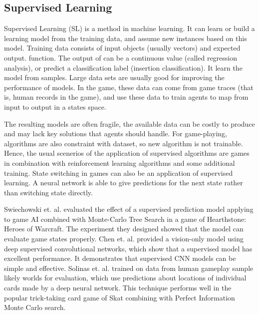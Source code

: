 \documentclass[11pt,en]{elegantpaper}
\begin{document}
\subsection{Supervised Learning}
Supervised Learning (SL) is a method in machine learning. It can learn or build a learning model from the training data, and assume new instances based on this model. Training data consists of input objects (usually vectors) and expected output. function. The output of can be a continuous value (called regression analysis), or predict a classification label (insertion classification). It learn the model from samples. Large data sets are usually good for improving the performance of models. In the game, these data can come from game traces (that is, human records in the game), and use these data to train agents to map from input to output in a states space.

The resulting models are often fragile, the available data can be costly to produce and may lack key solutions that agents should handle. For game-playing, algorithms are also constraint with dataset, so new algorithm is not trainable. Hence, the usual scenerios of the application of supervised algorithms are games in combination with reinforcement learning algorithms and some additional training. State switching in games can also be an application of supervised learning. A neural network is able to give predictions for the next state rather than switching state directly.

Swiechowski et. al. \cite{a1} evaluated the effect of a supervised prediction model applying to game AI combined with Monte-Carlo Tree Search in a game of Hearthstone: Heroes of Warcraft. The experiment they designed showed that the model can evaluate game states properly. Chen et. al. \cite{a2} provided a vision-only model using deep supervised convolutional networks, which show that a supervised model has excellent performance. It demonstrates that supervised CNN models can be simple and effective. Solinas et. al. \cite{a3} trained on data from human gameplay sample likely worlds for evaluation, which use predictions about locations of individual cards made by a deep neural network. This technique performs well in the popular trick-taking card game of Skat combining with Perfect Information Monte Carlo search.
\end{document}
